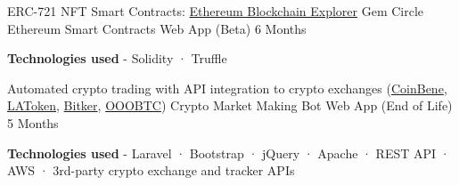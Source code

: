 \begin{cventries}
{\begin{cvitems}
      \end{cvitems}
    }
  \cventry
    {ERC-721 NFT Smart Contracts: \href{https://ropsten.etherscan.io/address/0x0EEFa3F75083b7a580CEb885Ec090443293daA8B}{Ethereum Blockchain Explorer}} %
    {Gem Circle Ethereum Smart Contracts} %
    {Web App (Beta)} %
    {6 Months} %
    {
      \begin{cvitems} %
        \item {\textbf{Technologies used} \hspace{0.03cm} - \hspace{0.03cm} Solidity \hspace{0.03cm} · \hspace{0.03cm} Truffle \\}
      \end{cvitems}
    }
  \cventry
    {Automated crypto trading with API integration to crypto exchanges (\href{https://coinmarketcap.com/exchanges/coinbene/}{CoinBene}, \href{https://coinmarketcap.com/exchanges/latoken/}{LAToken}, \href{https://coinmarketcap.com/exchanges/bitker/}{Bitker}, \href{https://coinmarketcap.com/exchanges/ooobtc/}{OOOBTC}) } %
    {Crypto Market Making Bot} %
    {Web App (End of Life)} %
    {5 Months} %
    {
      \begin{cvitems} %
        \item {\textbf{Technologies used} \hspace{0.03cm} - \hspace{0.03cm} Laravel \hspace{0.03cm} · \hspace{0.03cm} Bootstrap \hspace{0.03cm} · \hspace{0.03cm} jQuery \hspace{0.03cm} · \hspace{0.03cm} Apache \hspace{0.03cm} · \hspace{0.03cm} REST API \hspace{0.03cm} · \hspace{0.03cm} AWS \hspace{0.03cm} · \hspace{0.03cm} 3rd-party crypto exchange and tracker APIs \\}
      \end{cvitems}
    }
\end{cventries}
